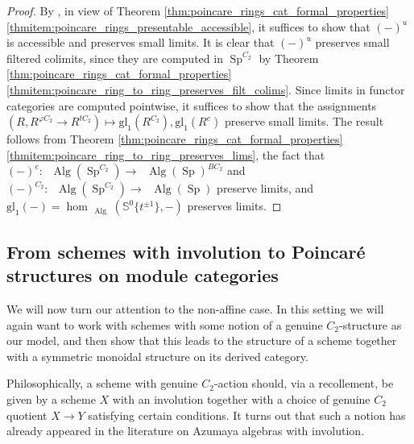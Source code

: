 \documentclass{article}
\DeclareMathOperator{\Alg}{Alg} %
\DeclareMathOperator{\Einfty}{\mathbf{E}_\infty} %
\DeclareMathOperator{\Spectra}{Sp} %
\newcommand{\sphere}{\mathbb{S}^0}
\theoremstyle{definition}
\newcommand{\Lucyil}[1]{\todo[color=cyan!30,inline]{\linespread{1}\footnotesize L: #1}}
\begin{document}
\begin{proof}
    By \cite[Corollary 5.5.2.9]{HTT}, in view of Theorem \ref{thm:poincare_rings_cat_formal_properties}\ref{thmitem:poincare_rings_presentable_accessible}, it suffices to show that $ (-)^u $ is accessible and preserves small limits. 
    It is clear that $ (-)^u $ preserves small filtered colimits, since they are computed in $ \Spectra^{C_2} $ by Theorem \ref{thm:poincare_rings_cat_formal_properties}\ref{thmitem:poincare_ring_to_ring_preserves_filt_colims}. 
    Since limits in functor categories are computed pointwise, it suffices to show that the assignments $ (R, R^{\varphi C_2} \to R^{tC_2}) \mapsto \mathrm{gl}_1(R^{C_2}), \mathrm{gl}_1(R^e) $ preserve small limits. 
    The result follows from Theorem \ref{thm:poincare_rings_cat_formal_properties}\ref{thmitem:poincare_ring_to_ring_preserves_lims}, the fact that $ (-)^e \colon \Einfty\Alg\left(\Spectra^{C_2}\right) \to \Einfty\Alg(\Spectra)^{BC_2} $ and $ (-)^{C_2} \colon \Einfty\Alg\left(\Spectra^{C_2}\right) \to \Einfty\Alg(\Spectra) $ preserve limits, and $ \mathrm{gl}_1(-) = \hom_{\Einfty\Alg}\left(\sphere\{t^{\pm 1}\},-\right) $ preserves limits. 
\end{proof}


\subsection{From schemes with involution to Poincaré structures on module categories}\label{subsection:Poincare_structures_module_cats} 

We will now turn our attention to the non-affine case. In this setting we will again want to work with schemes with some notion of a genuine $C_2$-structure as our model, and then show that this leads to the structure of a scheme together with a symmetric monoidal structure on its derived category. 

Philosophically, a scheme with genuine $C_2$-action should, via a recollement, be given by a scheme $X$ with an involution together with a choice of genuine $C_2$ quotient $X\to Y$ satisfying certain conditions. It turns out that such a notion has already appeared in the literature on Azumaya algebras with involution.
\end{document}
